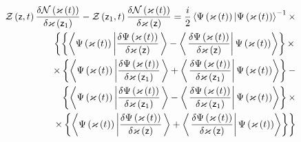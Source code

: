 \begin{eqnarray}
&&{\cal Z}\left( {\sf z},t\right) \frac{\delta {\cal N}\left( \varkappa
\left( t\right) \right) }{\delta \varkappa \left( {\sf z}_{1}\right) }-{\cal %
Z}\left( {\sf z}_{1},t\right) \frac{\delta {\cal N}\left( \varkappa \left(
t\right) \right) }{\delta \varkappa \left( {\sf z}\right) }=\frac{i}{2}%
\left\langle \Psi \left( {\cal \varkappa }\left( t\right) \right) |\Psi
\left( {\cal \varkappa }\left( t\right) \right) \right\rangle ^{-1}\times  
\nonumber \\
&&\left\{ \left\{ \left\langle \Psi \left( {\cal \varkappa }\left( t\right)
\right) \left| \frac{\delta \Psi \left( {\cal \varkappa }\left( t\right)
\right) }{\delta {\cal \varkappa }\left( {\sf z}\right) }\right.
\right\rangle -\left\langle \left. \frac{\delta \Psi \left( {\cal \varkappa }%
\left( t\right) \right) }{\delta {\cal \varkappa }\left( {\sf z}\right) }%
\right| \Psi \left( {\cal \varkappa }\left( t\right) \right) \right\rangle
\right\} \times \right.   \nonumber \\
&&\times \left\{ \left\langle \Psi \left( {\cal \varkappa }\left( t\right)
\right) \left| \frac{\delta \Psi \left( {\cal \varkappa }\left( t\right)
\right) }{\delta {\cal \varkappa }\left( {\sf z}_{1}\right) }\right.
\right\rangle +\left\langle \left. \frac{\delta \Psi \left( {\cal \varkappa }%
\left( t\right) \right) }{\delta {\cal \varkappa }\left( {\sf z}_{1}\right) }%
\right| \Psi \left( {\cal \varkappa }\left( t\right) \right) \right\rangle
\right\} -  \nonumber \\
&&\left\{ \left\langle \Psi \left( {\cal \varkappa }\left( t\right) \right)
\left| \frac{\delta \Psi \left( {\cal \varkappa }\left( t\right) \right) }{%
\delta {\cal \varkappa }\left( {\sf z}_{1}\right) }\right. \right\rangle
-\left\langle \left. \frac{\delta \Psi \left( {\cal \varkappa }\left(
t\right) \right) }{\delta {\cal \varkappa }\left( {\sf z}_{1}\right) }%
\right| \Psi \left( {\cal \varkappa }\left( t\right) \right) \right\rangle
\right\} \times   \nonumber \\
&&\left. \times \left\{ \left\langle \Psi \left( {\cal \varkappa }\left(
t\right) \right) \left| \frac{\delta \Psi \left( {\cal \varkappa }\left(
t\right) \right) }{\delta {\cal \varkappa }\left( {\sf z}\right) }\right.
\right\rangle +\left\langle \left. \frac{\delta \Psi \left( {\cal \varkappa }%
\left( t\right) \right) }{\delta {\cal \varkappa }\left( {\sf z}\right) }%
\right| \Psi \left( {\cal \varkappa }\left( t\right) \right) \right\rangle
\right\} \right\}   \nonumber \\

\end{eqnarray}
